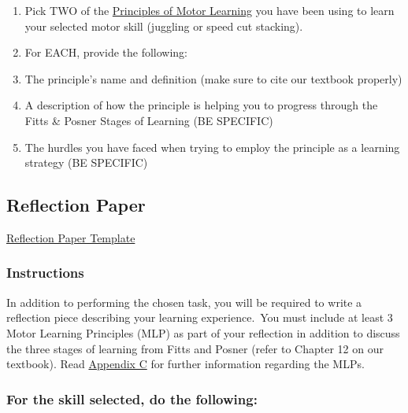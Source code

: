 \documentclass[
  letterpaper,
  DIV=11,
  numbers=noendperiod]{scrartcl}
\begin{document}
\begin{enumerate}
\def\labelenumi{\arabic{enumi}.}
\item
  Pick TWO of the \protect\hyperlink{sec-appendix-c}{Principles of Motor
  Learning} you have been using to learn your selected motor skill
  (juggling or speed cut stacking).
\item
  For EACH, provide the following:
\item
  The principle's name and definition (make sure to cite our textbook
  properly)
\item
  A description of how the principle is helping you to progress through
  the Fitts \& Posner Stages of Learning (BE SPECIFIC)
\item
  The hurdles you have faced when trying to employ the principle as a
  learning strategy (BE SPECIFIC)
\end{enumerate}

\hypertarget{sec-reflection-paper}{%
\subsection{Reflection Paper}\label{sec-reflection-paper}}

\href{https://docs.google.com/document/d/1zp0yN8EAQg6W9ecifHZ8NLonoi3ZMkrI/edit?usp=share_link\&ouid=102808224946914322692\&rtpof=true\&sd=true}{Reflection
Paper Template}

\hypertarget{instructions}{%
\subsubsection{Instructions}\label{instructions}}

In addition to performing the chosen task, you will be required to write
a reflection piece describing your learning experience.~You must include
at least 3 Motor Learning Principles (MLP) as part of your reflection in
addition to discuss the three stages of learning from Fitts and Posner
(refer to Chapter 12 on our textbook). Read
\protect\hyperlink{sec-appendix-c}{Appendix C} for further information
regarding the MLPs.

\hypertarget{for-the-skill-selected-do-the-following}{%
\subsubsection{For the skill selected, do the
following:}\label{for-the-skill-selected-do-the-following}}
\end{document}
